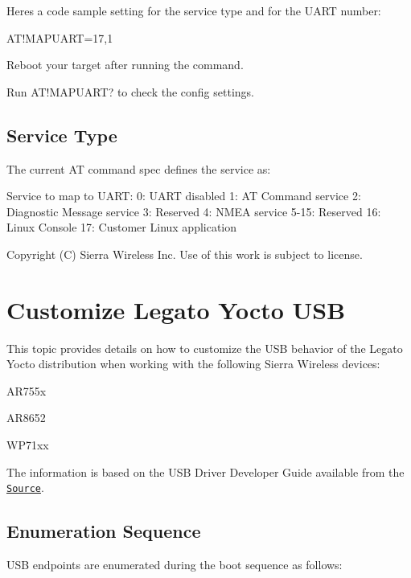 Here\textquotesingle{}s a code sample setting {} for the service type and {} for the U\+A\+R\+T number\+: 
\begin{DoxyCode}
AT!MAPUART=17,1
\end{DoxyCode}


Reboot your target after running the command.

Run {\ttfamily A\+T!\+M\+A\+P\+U\+A\+R\+T}? to check the config settings.\hypertarget{how_to_customize_u_a_r_t_howToCustomizeUART_serviceType}{}\subsection{Service Type}\label{how_to_customize_u_a_r_t_howToCustomizeUART_serviceType}
The current A\+T command spec defines the service as\+:

\begin{DoxyVerb}Service to map to UART:
0:  UART disabled
1:  AT Command service
2:  Diagnostic Message service
3:  Reserved
4:  NMEA service
5-15:  Reserved
16: Linux Console
17: Customer Linux application
\end{DoxyVerb}






Copyright (C) Sierra Wireless Inc. Use of this work is subject to license. \hypertarget{howToCustomizeUSB}{}\section{Customize Legato Yocto U\+S\+B}\label{howToCustomizeUSB}
This topic provides details on how to customize the U\+S\+B behavior of the Legato Yocto distribution when working with the following Sierra Wireless devices\+:
\begin{DoxyItemize}
\item A\+R755x
\item A\+R8652
\item W\+P71xx
\end{DoxyItemize}

The information is based on the U\+S\+B Driver Developer Guide available from the \href{http://source.sierrawireless.com/}{\tt Source}.\hypertarget{how_to_customize_u_s_b_howToCustomizeUSB_enumeration}{}\subsection{Enumeration Sequence}\label{how_to_customize_u_s_b_howToCustomizeUSB_enumeration}
U\+S\+B endpoints are enumerated during the boot sequence as follows\+:

